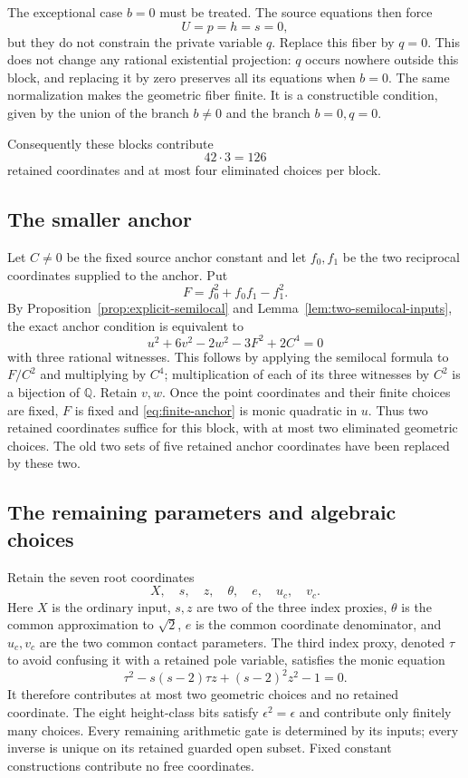 \documentclass[11pt]{article}
\theoremstyle{definition}
\begin{document}
The exceptional case $b=0$ must be treated.  The source equations then
force
\[
 U=p=h=s=0,
\]
but they do not constrain the private variable $q$.  Replace this
fiber by $q=0$.  This does not change any rational existential projection:
$q$ occurs nowhere outside this block, and replacing it by zero
preserves all its equations when $b=0$.  The same normalization makes
the geometric fiber finite.  It is a constructible condition, given
by the union of the branch $b\ne0$ and the branch $b=0,q=0$.

Consequently these blocks contribute
\[
 42\cdot3=126
\]
retained coordinates and at most four eliminated choices per block.

\subsection{The smaller anchor}

Let $C\ne0$ be the fixed source anchor constant and let $f_0,f_1$
be the two reciprocal coordinates supplied to the anchor.  Put
\[
 F=f_0^2+f_0f_1-f_1^2.
\]
By Proposition~\ref{prop:explicit-semilocal} and
Lemma~\ref{lem:two-semilocal-inputs}, the exact anchor condition is
equivalent to
\begin{equation}\label{eq:finite-anchor}
 u^2+6v^2-2w^2-3F^2+2C^4=0
\end{equation}
with three rational witnesses.  This follows by applying the
semilocal formula to $F/C^2$ and multiplying by $C^4$; multiplication
of each of its three witnesses by $C^2$ is a bijection of $\mathbb Q$.
Retain $v,w$.  Once the point coordinates and their finite choices
are fixed, $F$ is fixed and \eqref{eq:finite-anchor} is monic quadratic
in $u$.  Thus two retained coordinates suffice for this block, with
at most two eliminated geometric choices.  The old two sets of five
retained anchor coordinates have been replaced by these two.

\subsection{The remaining parameters and algebraic choices}

Retain the seven root coordinates
\[
 X,\quad s,\quad z,\quad\theta,\quad e,\quad u_c,\quad v_c.
\]
Here $X$ is the ordinary input, $s,z$ are two of the three index
proxies, $\theta$ is the common approximation to $\sqrt2$, $e$ is
the common coordinate denominator, and $u_c,v_c$ are the two common
contact parameters.  The third index proxy, denoted $\tau$ to avoid
confusing it with a retained pole variable, satisfies the monic equation
\[
 \tau^2-s(s-2)\tau z+(s-2)^2z^2-1=0.
\]
It therefore contributes at most two geometric choices and no retained
coordinate.  The eight height-class bits satisfy $\epsilon^2=\epsilon$
and contribute only finitely many choices.  Every remaining arithmetic
gate is determined by its inputs; every inverse is unique on its
retained guarded open subset.  Fixed constant constructions contribute
no free coordinates.
\end{document}
